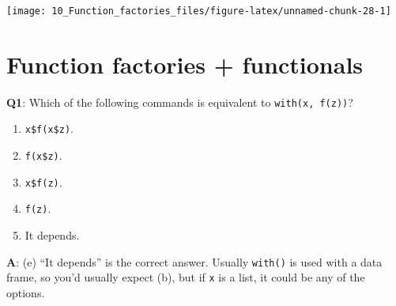 \documentclass[
]{krantz}
\makeatletter
\newenvironment{Shaded}{\begin{snugshade}}{\end{snugshade}}
\newcommand{\CommentTok}[1]{\textcolor[rgb]{0.56,0.35,0.01}{\textit{#1}}}
\newcommand{\DataTypeTok}[1]{\textcolor[rgb]{0.13,0.29,0.53}{#1}}
\newcommand{\DecValTok}[1]{\textcolor[rgb]{0.00,0.00,0.81}{#1}}
\newcommand{\KeywordTok}[1]{\textcolor[rgb]{0.13,0.29,0.53}{\textbf{#1}}}
\newcommand{\NormalTok}[1]{#1}
\newcommand{\OperatorTok}[1]{\textcolor[rgb]{0.81,0.36,0.00}{\textbf{#1}}}
\newcommand{\StringTok}[1]{\textcolor[rgb]{0.31,0.60,0.02}{#1}}
\providecommand{\tightlist}{%
  \setlength{\itemsep}{0pt}\setlength{\parskip}{0pt}}
\newenvironment{kframe}{%
\medskip{}
\setlength{\fboxsep}{.8em}
 \def\at@end@of@kframe{}%
 \ifinner\ifhmode%
  \def\at@end@of@kframe{\end{minipage}}%
  \begin{minipage}{\columnwidth}%
 \fi\fi%
 \def\FrameCommand##1{\hskip\@totalleftmargin \hskip-\fboxsep
 \colorbox{shadecolor}{##1}\hskip-\fboxsep
     \hskip-\linewidth \hskip-\@totalleftmargin \hskip\columnwidth}%
 \MakeFramed {\advance\hsize-\width
   \@totalleftmargin\z@ \linewidth\hsize
   \@setminipage}}%
 {\par\unskip\endMakeFramed%
 \at@end@of@kframe}
\renewenvironment{Shaded}{\begin{kframe}}{\end{kframe}}
\renewcommand{\KeywordTok} [1]{\textcolor[rgb]{0.00,0.44,0.13}{{#1}}}
\renewcommand{\DataTypeTok}[1]{\textcolor[rgb]{0.56,0.13,0.00}{{#1}}}
\renewcommand{\DecValTok}  [1]{\textcolor[rgb]{0.25,0.63,0.44}{{#1}}}
\renewcommand{\StringTok}  [1]{\textcolor[rgb]{0.25,0.44,0.63}{{#1}}}
\renewcommand{\CommentTok} [1]{\textcolor[rgb]{0.38,0.63,0.69}{{#1}}}
\renewcommand{\NormalTok}  [1]{{#1}}
\makeatother
\begin{document}
\begin{center}\texttt{[image: 10\_Function\_factories\_files/figure-latex/unnamed-chunk-28-1]} \end{center}

\hypertarget{function-factories-functionals}{%
\section{Function factories + functionals}\label{function-factories-functionals}}

\textbf{{Q1}}: Which of the following commands is equivalent to \texttt{with(x,\ f(z))}?

\begin{enumerate}
\def\labelenumi{(\alph{enumi})}
\tightlist
\item
  \texttt{x\$f(x\$z)}.
\item
  \texttt{f(x\$z)}.
\item
  \texttt{x\$f(z)}.
\item
  \texttt{f(z)}.
\item
  It depends.
\end{enumerate}

\textbf{{A}}: (e) ``It depends'' is the correct answer. Usually \texttt{with()} is used with a data frame, so you'd usually expect (b), but if \texttt{x} is a list, it could be any of the options.

\begin{Shaded}
\end{Shaded}
\end{document}
